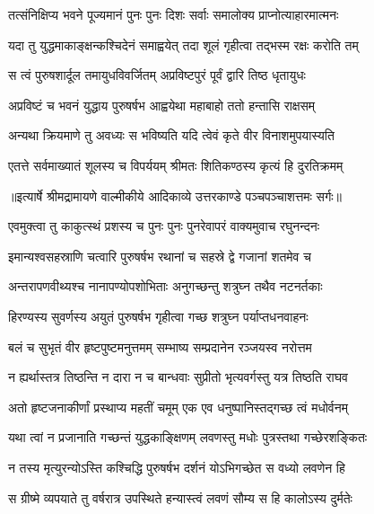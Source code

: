 \twolineshloka
{तत्संनिक्षिप्य भवने पूज्यमानं पुनः पुनः}
{दिशः सर्वाः समालोक्य प्राप्नोत्याहारमात्मनः} %

\twolineshloka
{यदा तु युद्धमाकाङ्क्षन्कश्चिदेनं समाह्वयेत्}
{तदा शूलं गृहीत्वा तद्भस्म रक्षः करोति तम्} %

\twolineshloka
{स त्वं पुरुषशार्दूल तमायुधविवर्जितम्}
{अप्रविष्टपुरं पूर्वं द्वारि तिष्ठ धृतायुधः} %

\twolineshloka
{अप्रविष्टं च भवनं युद्धाय पुरुषर्षभ}
{आह्वयेथा महाबाहो ततो हन्तासि राक्षसम्} %

\twolineshloka
{अन्यथा क्रियमाणे तु अवध्यः स भविष्यति}
{यदि त्वेवं कृते वीर विनाशमुपयास्यति} %

\twolineshloka
{एतत्ते सर्वमाख्यातं शूलस्य च विपर्ययम्}
{श्रीमतः शितिकण्ठस्य कृत्यं हि दुरतिक्रमम्} %


{॥इत्यार्षे श्रीमद्रामायणे वाल्मीकीये आदिकाव्ये उत्तरकाण्डे पञ्चपञ्चाशत्तमः सर्गः॥}


\twolineshloka
{एवमुक्त्वा तु काकुत्स्थं प्रशस्य च पुनः पुनः}
{पुनरेवापरं वाक्यमुवाच रघुनन्दनः} %

\twolineshloka
{इमान्यश्वसहस्राणि चत्वारि पुरुषर्षभ}
{रथानां च सहस्रे द्वे गजानां शतमेव च} %

\twolineshloka
{अन्तरापणवीथ्यश्च नानापण्योपशोभिताः}
{अनुगच्छन्तु शत्रुघ्न तथैव नटनर्तकाः} %

\twolineshloka
{हिरण्यस्य सुवर्णस्य अयुतं पुरुषर्षभ}
{गृहीत्वा गच्छ शत्रुघ्न पर्याप्तधनवाहनः} %

\twolineshloka
{बलं च सुभृतं वीर हृष्टपुष्टमनुत्तमम्}
{सम्भाष्य सम्प्रदानेन रञ्जयस्व नरोत्तम} %

\twolineshloka
{न ह्यर्थास्तत्र तिष्ठन्ति न दारा न च बान्धवाः}
{सुप्रीतो भृत्यवर्गस्तु यत्र तिष्ठति राघव} %

\twolineshloka
{अतो हृष्टजनाकीर्णां प्रस्थाप्य महतीं चमूम्}
{एक एव धनुष्पानिस्तद्गच्छ त्वं मधोर्वनम्} %

\twolineshloka
{यथा त्वां न प्रजानाति गच्छन्तं युद्धकाङ्क्षिणम्}
{लवणस्तु मधोः पुत्रस्तथा गच्छेरशङ्कितः} %

\twolineshloka
{न तस्य मृत्युरन्योऽस्ति कश्चिद्धि पुरुषर्षभ}
{दर्शनं योऽभिगच्छेत स वध्यो लवणेन हि} %

\twolineshloka
{स ग्रीष्मे व्यपयाते तु वर्षरात्र उपस्थिते}
{हन्यास्त्वं लवणं सौम्य स हि कालोऽस्य दुर्मतेः} %

